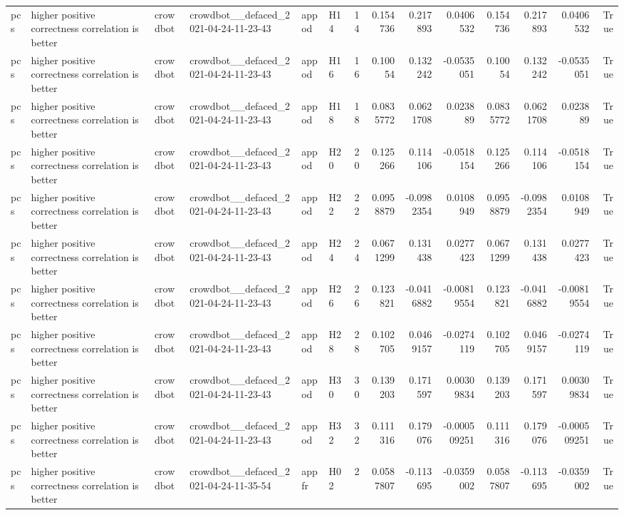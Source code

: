 \begin{longtable}{llllllrrrrrrrr}
pcs & higher positive correctness correlation is better & crowdbot & crowdbot\_\_defaced\_2021-04-24-11-23-43 & appod & H14 & 14 & 0.154736 & 0.217893 & 0.0406532 & 0.154736 & 0.217893 & 0.0406532 & True \\
pcs & higher positive correctness correlation is better & crowdbot & crowdbot\_\_defaced\_2021-04-24-11-23-43 & appod & H16 & 16 & 0.10054 & 0.132242 & -0.0535051 & 0.10054 & 0.132242 & -0.0535051 & True \\
pcs & higher positive correctness correlation is better & crowdbot & crowdbot\_\_defaced\_2021-04-24-11-23-43 & appod & H18 & 18 & 0.0835772 & 0.0621708 & 0.023889 & 0.0835772 & 0.0621708 & 0.023889 & True \\
pcs & higher positive correctness correlation is better & crowdbot & crowdbot\_\_defaced\_2021-04-24-11-23-43 & appod & H20 & 20 & 0.125266 & 0.114106 & -0.0518154 & 0.125266 & 0.114106 & -0.0518154 & True \\
pcs & higher positive correctness correlation is better & crowdbot & crowdbot\_\_defaced\_2021-04-24-11-23-43 & appod & H22 & 22 & 0.0958879 & -0.0982354 & 0.0108949 & 0.0958879 & -0.0982354 & 0.0108949 & True \\
pcs & higher positive correctness correlation is better & crowdbot & crowdbot\_\_defaced\_2021-04-24-11-23-43 & appod & H24 & 24 & 0.0671299 & 0.131438 & 0.0277423 & 0.0671299 & 0.131438 & 0.0277423 & True \\
pcs & higher positive correctness correlation is better & crowdbot & crowdbot\_\_defaced\_2021-04-24-11-23-43 & appod & H26 & 26 & 0.123821 & -0.0416882 & -0.00819554 & 0.123821 & -0.0416882 & -0.00819554 & True \\
pcs & higher positive correctness correlation is better & crowdbot & crowdbot\_\_defaced\_2021-04-24-11-23-43 & appod & H28 & 28 & 0.102705 & 0.0469157 & -0.0274119 & 0.102705 & 0.0469157 & -0.0274119 & True \\
pcs & higher positive correctness correlation is better & crowdbot & crowdbot\_\_defaced\_2021-04-24-11-23-43 & appod & H30 & 30 & 0.139203 & 0.171597 & 0.00309834 & 0.139203 & 0.171597 & 0.00309834 & True \\
pcs & higher positive correctness correlation is better & crowdbot & crowdbot\_\_defaced\_2021-04-24-11-23-43 & appod & H32 & 32 & 0.111316 & 0.179076 & -0.000509251 & 0.111316 & 0.179076 & -0.000509251 & True \\
pcs & higher positive correctness correlation is better & crowdbot & crowdbot\_\_defaced\_2021-04-24-11-35-54 & appfr & H02 & 2 & 0.0587807 & -0.113695 & -0.0359002 & 0.0587807 & -0.113695 & -0.0359002 & True \\

\end{longtable}
